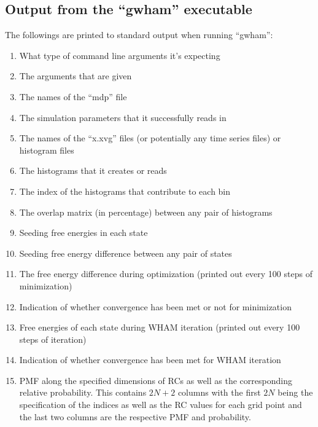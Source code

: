 \subsection{Output from the ``gwham'' executable}
The followings are printed to standard output when running ``gwham'':
\begin{enumerate}
  \item What type of command line arguments it's expecting
  \item The arguments that are given
  \item The names of the ``mdp'' file
  \item The simulation parameters that it successfully reads in
  \item The names of the ``x.xvg'' files (or potentially any time series files)
  or histogram files
  \item The histograms that it creates or reads
  \item The index of the histograms that contribute to each bin
  \item The overlap matrix (in percentage) between any pair of histograms
  \item Seeding free energies in each state
  \item Seeding free energy difference between any pair of states
  \item The free energy difference during optimization (printed out every 100
  steps of minimization)
  \item Indication of whether convergence has been met or not for minimization
  \item Free energies of each state during WHAM iteration (printed out every
  100 steps of iteration)
  \item Indication of whether convergence has been met for WHAM iteration
  \item PMF along the specified dimensions of RCs as well as the corresponding
  relative probability.  This contains $2N+2$ columns with the first $2N$ being
  the specification of the indices as well as the RC values for each grid point
  and the last two columns are the respective PMF and probability.
\end{enumerate}
